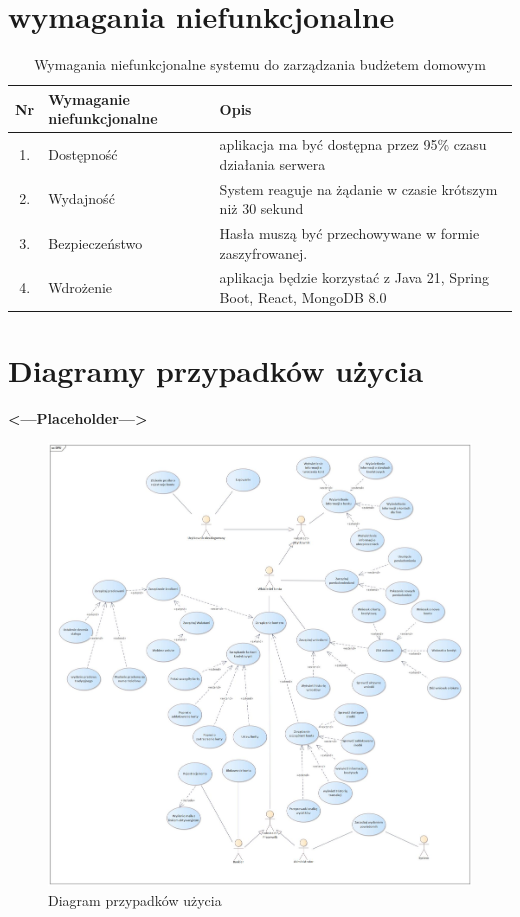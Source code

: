 \section{wymagania niefunkcjonalne}
\begin{table}[H]
	\centering
	\renewcommand{\arraystretch}{1.3}
	\setlength{\tabcolsep}{6pt}
	\begin{tabular}{|c|p{5cm}|p{8cm}|}
		\hline
		\textbf{Nr} & \textbf{Wymaganie niefunkcjonalne} & \textbf{Opis} \\ \hline
		
		1. & Dostępność & aplikacja ma być dostępna przez 95\% czasu działania serwera \\ \hline
		2. & Wydajność & System reaguje na żądanie w czasie krótszym niż 30 sekund \\ \hline
		3. & Bezpieczeństwo & Hasła muszą być przechowywane w formie zaszyfrowanej. \\ \hline
		4. & Wdrożenie & aplikacja będzie korzystać z Java 21, Spring Boot, React, MongoDB 8.0 \\ \hline
		
	\end{tabular}
	\caption{Wymagania niefunkcjonalne systemu do zarządzania budżetem domowym}
	\label{tab:wymagania_niefunkcjonalne}
\end{table}
\section{Diagramy przypadków użycia}
\textbf{<---Placeholder--->}
\begin{figure}[H]
	\centering
	\includegraphics[width=1\textwidth]{images/DPU.jpg}
	\caption{Diagram przypadków użycia}
	\label{fig:UseCase}
\end{figure}
